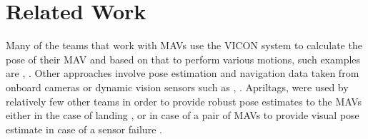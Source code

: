\section{Related Work}
\label{sec:related_work}
  
Many of the teams that work with MAVs use the VICON system to calculate the pose of their MAV and based on that to perform various motions, such examples are \cite{Mellinger:2012:TGC:2190635.2190636}, \cite{ducSIES09}. Other approaches involve pose estimation and navigation data taken from onboard cameras or dynamic vision sensors such as \cite{6880770}, \cite{6942940}. Apriltags, were used by relatively few other teams in order to provide robust pose estimates to the MAVs either in the case of landing \cite{schaves-2015a}, \cite{lingkevin2014} or in case of a pair of MAVs to provide visual pose estimate in case of a sensor failure \cite{hoogervorst2015bsc}.